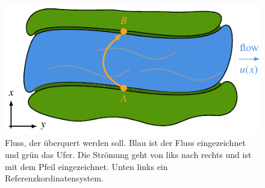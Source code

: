 \begin{figure}
%    
%    
%    
    \includegraphics{papers/schwimmen/tikz/fluss-coord.pdf}
    \caption{Fluss, der überquert werden soll. Blau ist der Fluss eingezeichnet und grün das Ufer. Die Strömung geht von liks nach rechts und ist mit dem Pfeil eingezeichnet. Unten links ein Referenzkordinatensystem.}
    \label{fig:river_points}
\end{figure}
